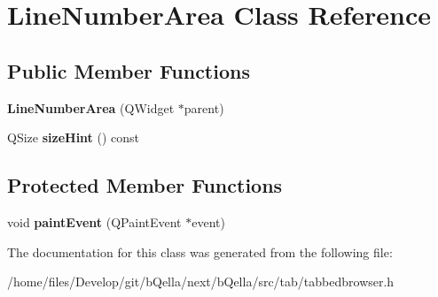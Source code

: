 \hypertarget{classLineNumberArea}{
\section{LineNumberArea Class Reference}
\label{classLineNumberArea}
}
\subsection*{Public Member Functions}
\begin{DoxyCompactItemize}
\item 
\hypertarget{classLineNumberArea_ac310fb5c44dc1d5ffd3ee7ffca73bdc2}{
{\bfseries LineNumberArea} (QWidget $\ast$parent)}
\label{classLineNumberArea_ac310fb5c44dc1d5ffd3ee7ffca73bdc2}

\item 
\hypertarget{classLineNumberArea_a5d31f7fb107bc1eefd7ae4974c095308}{
QSize {\bfseries sizeHint} () const }
\label{classLineNumberArea_a5d31f7fb107bc1eefd7ae4974c095308}

\end{DoxyCompactItemize}
\subsection*{Protected Member Functions}
\begin{DoxyCompactItemize}
\item 
\hypertarget{classLineNumberArea_a56400934bfe272427deb3ffd975b3a7f}{
void {\bfseries paintEvent} (QPaintEvent $\ast$event)}
\label{classLineNumberArea_a56400934bfe272427deb3ffd975b3a7f}

\end{DoxyCompactItemize}


The documentation for this class was generated from the following file:\begin{DoxyCompactItemize}
\item 
/home/files/Develop/git/bQella/next/bQella/src/tab/tabbedbrowser.h\end{DoxyCompactItemize}
